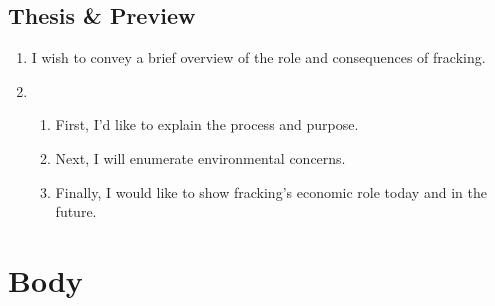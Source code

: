 \documentclass{article}
\begin{document}
  \subsection{Thesis \& Preview}
    \begin{enumerate}
      \item I wish to convey a brief overview of the role and consequences of fracking.
      \item \begin{enumerate}
        \item First, I'd like to explain the process and purpose.
        \item Next, I will enumerate environmental concerns.
        \item Finally, I would like to show fracking's economic role today and in the future.
      \end{enumerate}
    \end{enumerate}
  
\section{Body}
\end{document}
